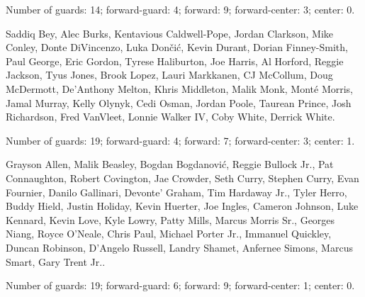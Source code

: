 \documentclass[USenglish]{article}
\theoremstyle{dgthm}
\theoremstyle{dgdef}
\begin{document}
\begin{appendix}
\begin{description}
	      Number of guards: 14; forward-guard: 4; forward: 9; forward-center: 3; center: 0.

	\item[Cluster 4] Saddiq Bey, Alec Burks, Kentavious Caldwell-Pope, Jordan Clarkson, Mike Conley, Donte DiVincenzo, Luka Dončić, Kevin Durant, Dorian Finney-Smith, Paul George, Eric Gordon, Tyrese Haliburton, Joe Harris, Al Horford, Reggie Jackson, Tyus Jones, Brook Lopez, Lauri Markkanen, CJ McCollum, Doug McDermott, De'Anthony Melton, Khris Middleton, Malik Monk, Monté Morris, Jamal Murray, Kelly Olynyk, Cedi Osman, Jordan Poole, Taurean Prince, Josh Richardson, Fred VanVleet, Lonnie Walker IV, Coby White, Derrick White.

	      Number of guards: 19; forward-guard: 4; forward: 7; forward-center: 3; center: 1.

	\item[Cluster 5] Grayson Allen, Malik Beasley, Bogdan Bogdanović, Reggie Bullock Jr., Pat Connaughton, Robert Covington, Jae Crowder, Seth Curry, Stephen Curry, Evan Fournier, Danilo Gallinari, Devonte' Graham, Tim Hardaway Jr., Tyler Herro, Buddy Hield, Justin Holiday, Kevin Huerter, Joe Ingles, Cameron Johnson, Luke Kennard, Kevin Love, Kyle Lowry, Patty Mills, Marcus Morris Sr., Georges Niang, Royce O'Neale, Chris Paul, Michael Porter Jr., Immanuel Quickley, Duncan Robinson, D'Angelo Russell, Landry Shamet, Anfernee Simons, Marcus Smart, Gary Trent Jr..

	      Number of guards: 19; forward-guard: 6; forward: 9; forward-center: 1; center: 0.

\end{description}



\end{appendix}
\end{document}
